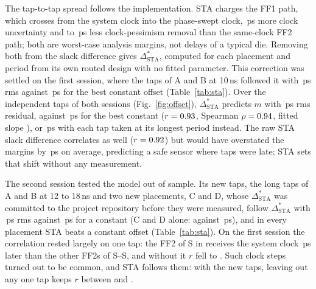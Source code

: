 \documentclass[conference]{IEEEtran}
\newcommand{\Dst}{\Delta^{*}_\mathrm{STA}}
\begin{document}
\begin{table}[t]
\centering
\caption{Per-tap results of the first session (16\,nm, 10\,ns): first failing voltage $V_f$ (V,
SYSMON), measured margin $m$ with its interval (super- and subscript) and predicted offset $\Dst$
(ps); $m'$, $m''$: margin of the same routed design with the 250 and the 125\,ps guard. $m>0$: the
reading reached zero before the first error. Means over \vTapASweeps{} (A), \vTapBSweeps{} (B) and
\vTapGSweeps{} (guards) voltage sweeps.}
\label{tab:taps}
\footnotesize
\setlength{\tabcolsep}{2.2pt}

\end{table}

The tap-to-tap spread follows the implementation. STA charges the FF1 path, which crosses from the
system clock into the phase-swept clock, \vAllDU\,ps more clock uncertainty and \vAllDCPRLo{} to
\vAllDCPRHi\,ps less clock-pessimism removal than the same-clock FF2 path; both are worst-case
analysis margins, not delays of a typical die. Removing both from the slack difference gives $\Dst$,
computed for each placement and period from its own routed design with no fitted parameter. This
correction was settled on the first session, where the \vSessN{} taps of A and B at 10\,ns followed it with
\vSessRms\,ps rms against \vSessNullRms\,ps for the best constant offset (Table~\ref{tab:sta}). Over
the \vAllN{} independent taps of both sessions (Fig.~\ref{fig:offset}), $\Dst$ predicts $m$ with
\vAllRms\,ps rms residual, against \vAllNullRms\,ps for the best constant ($r=0.93$, Spearman
$\rho=0.94$, fitted slope \vAllSlope), or \vAllAltLongRms\,ps with each tap taken at its longest
period instead. The raw STA slack difference correlates as well ($r=0.92$) but would have
overstated the margins by \vAllRawBiasAbs\,ps on average, predicting a safe sensor where
\vAllLateBest{} taps were late; STA sets that shift without any measurement.

\begin{table}[t]
\centering
\caption{STA prediction of the margin, per set of independent taps: correlation $r$ and
least-squares slope of $m$ on $\Dst$, rms of $m-\Dst$ (no fitted parameter) and of $m$ about its
mean (the best constant). $^\dagger$\,$\Dst$ committed before the measurement.}
\label{tab:sta}
\footnotesize
\setlength{\tabcolsep}{3.5pt}

\end{table}

The second session tested the model out of sample. Its \vNewN{} new taps, the long taps of A and B
at 12 to 18\,ns and two new placements, C and D, whose $\Dst$ was committed to the project
repository before they were measured, follow $\Dst$ with \vNewRms\,ps rms against \vNewNullRms\,ps
for a constant (C and D alone: \vCDRms{} against \vCDNullRms\,ps), and in every placement STA beats
a constant offset (Table~\ref{tab:sta}). On the first session the correlation rested largely on one
tap: the FF2 of S\vLooStage{} in \vLooImpl{} receives the system clock \vClkOutPs\,ps later than the
other FF2s of S\vTapAStageLo--S\vTapAStageHi, and without it $r$ fell to \vLooR. Such clock steps turned out to be common, and STA
follows them: with the new taps, leaving out any one tap keeps $r$ between \vAllLooRLo{} and
\vAllLooRHi.
\end{document}
